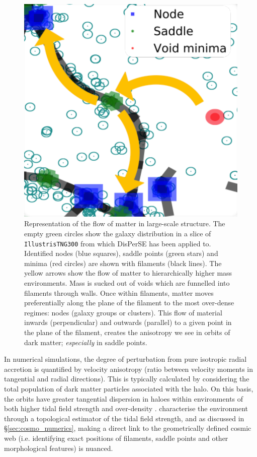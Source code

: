 \begin{figure}
    \centering
	\includegraphics[width=0.5\linewidth]{thesis/latex/dyn_mod_files/disperse_matter_path.pdf}
    \caption{Representation of the flow of matter in large-scale structure. The empty green circles show the galaxy distribution in a slice of \texttt{IllustrisTNG300}  from which DisPerSE has been applied to. Identified nodes (blue squares), saddle points (green stars) and minima (red circles) are shown with filaments (black lines). The yellow arrows show the flow of matter to hierarchically higher mass environments. Mass is sucked out of voids which are funnelled into filaments through walls. Once within filaments, matter moves preferentially along the plane of the filament to the most over-dense regimes: nodes (galaxy groups or clusters). This flow of material inwards (perpendicular) and outwards (parallel) to a given point in the plane of the filament, creates the anisotropy we see in orbits of dark matter; \textit{especially} in saddle points.}
    \label{fig:disperse_matter_path}
\end{figure}

In numerical simulations, the degree of perturbation from pure isotropic radial accretion is quantified by velocity anisotropy (ratio between velocity moments in tangential and radial directions). This is typically calculated by considering the total population of dark matter particles associated with the halo. On this basis, the orbits have greater tangential dispersion in haloes within environments of both higher tidal field strength and over-density \citep[e.g.][]{faltenbacher2010, shi2015}. \citet{shi2015} characterise the environment through a topological estimator of the tidal field strength, and as discussed in \S\ref{sec:cosmo_numerics}, making a direct link to the geometrically defined cosmic web (i.e. identifying exact positions of filaments, saddle points and other morphological features) is nuanced.  

